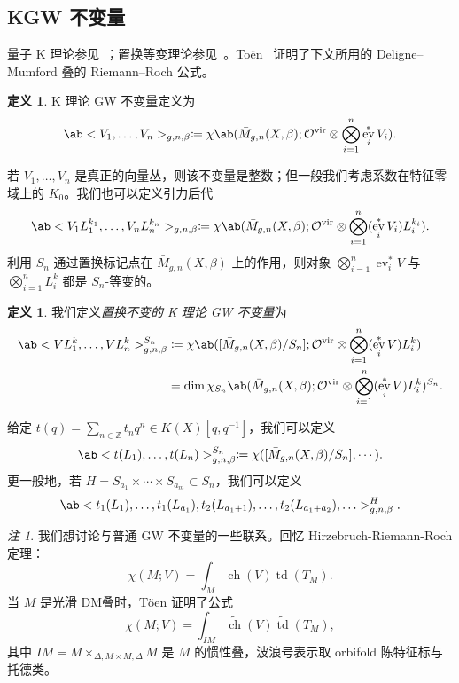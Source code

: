 \documentclass{amsart}
\theoremstyle{definition}
\newtheorem{defn}[thm]{定义}
\theoremstyle{remark}
\newtheorem{rmk}[thm]{注}
\theoremstyle{plain}
\theoremstyle{definition}
\theoremstyle{remark}
\newcommand{\Z}{\mathbb{Z}}
\newcommand{\mc}[1]{\mathcal{#1}}
\newcommand{\mr}[1]{\mathrm{#1}}
\newcommand{\on}[1]{\operatorname{#1}}
\newcommand{\wt}[1]{\widetilde{#1}}
\newcommand{\1}{\mathbf{1}}
\newcommand{\2}{\mathbf{2}}
\newcommand{\3}{\mathbf{3}}
\newcommand{\vir}{\mr{vir}}
\DeclareMathOperator{\ev}{ev}
\begin{document}
\subsection{KGW 不变量}%
\label{sub:KGW invariants}

量子 K 理论参见~\cite{Lee2004}；置换等变理论参见~\cite{Givental2017K1,GiventalK7}。To\"en~\cite{Toen1999} 证明了下文所用的 Deligne--Mumford 叠的 Riemann--Roch 公式。

\begin{defn}
    K 理论 GW 不变量定义为
    \[ \ab<V_1, \ldots, V_n>_{g,n,\beta} \coloneqq \chi\ab(\bar{M}_{g,n}(X, \beta); \mc{O}^{\vir} \otimes \bigotimes_{i=1}^n \ev_i^* V_i). \]
\end{defn}

若 \(V_1, \ldots, V_n\) 是真正的向量丛，则该不变量是整数；但一般我们考虑系数在特征零域上的 \(K_0\)。我们也可以定义引力后代
\[ \ab<V_1 L_1^{k_1}, \ldots, V_n L_n^{k_n}>_{g,n,\beta} \coloneqq \chi\ab(\bar{M}_{g,n}(X, \beta); \mc{O}^{\vir} \otimes \bigotimes_{i=1}^n ( \ev_i^* V_i )L_i^{k_i} ). \]
利用 \(S_n\) 通过置换标记点在 \(\bar{M}_{g,n}(X, \beta)\) 上的作用，则对象 \(\bigotimes_{i=1}^n \ev_i^* V\) 与 \(\bigotimes_{i=1}^n L_i^k\) 都是 \(S_n\)-等变的。

\begin{defn}
    我们定义\textit{置换不变的 K 理论 GW 不变量}为
    \begin{align*}
        \ab<V L_1^k, \ldots, V L_n^k>_{g,n,\beta}^{S_n} &\coloneqq \chi\ab([ \bar{M}_{g,n}(X, \beta)/S_n ]; \mc{O}^{\vir} \otimes \bigotimes_{i=1}^n ( \ev_i^* V ) L_i^k) \\
        &= \dim \chi_{S_n} \ab(\bar{M}_{g,n}(X, \beta); \mc{O}^{\vir} \otimes \bigotimes_{i=1}^n ( \ev_i^* V ) L_i^k )^{S_n}.
    \end{align*}
\end{defn}

给定 \(t(q) = \sum_{n \in \Z} t_n q^n \in K(X)[q,q^{-1}]\)，我们可以定义
\[ \ab< t(L_1), \ldots, t(L_n)>^{S_n}_{g,n,\beta} \coloneqq \chi ([\bar{M}_{g,n}(X,\beta)/S_n], \cdots). \]
更一般地，若 \(H = S_{a_1} \times \cdots \times S_{a_m} \subset S_n\)，我们可以定义
\[ \ab<t_1(L_1), \ldots, t_1(L_{a_1}), t_2(L_{a_1+1}), \ldots, t_2(L_{a_1+a_2}), \ldots>_{g,n,\beta}^H. \]

\begin{rmk}
    我们想讨论与普通 GW 不变量的一些联系。回忆 Hirzebruch-Riemann-Roch 定理：
    \[ \chi(M; V) = \int_M \on{ch}(V) \on{td}(T_M). \]
    当 \(M\) 是光滑 DM叠时，T\"oen 证明了公式
    \[ \chi(M; V) = \int_{IM} \wt{\on{ch}}(V) \wt{\on{td}}(T_M), \]
    其中 \(IM = M \times_{\Delta, M \times M, \Delta} M\) 是 \(M\) 的惯性叠，波浪号表示取 orbifold 陈特征标与托德类。
\end{rmk}
\end{document}
